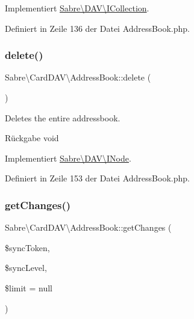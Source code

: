 Implementiert \mbox{\hyperlink{interface_sabre_1_1_d_a_v_1_1_i_collection_a837d88dac548706770368200f83c2ebc}{Sabre\textbackslash{}\+D\+A\+V\textbackslash{}\+I\+Collection}}.



Definiert in Zeile 136 der Datei Address\+Book.\+php.

\mbox{\label{class_sabre_1_1_card_d_a_v_1_1_address_book_a1bbb96f2d63e34d67c6172c0b3062376}} 
\subsubsection{\texorpdfstring{delete()}{delete()}}
{\footnotesize\ttfamily Sabre\textbackslash{}\+Card\+D\+A\+V\textbackslash{}\+Address\+Book\+::delete (\begin{DoxyParamCaption}{ }\end{DoxyParamCaption})}

Deletes the entire addressbook.

\begin{DoxyReturn}{Rückgabe}
void 
\end{DoxyReturn}


Implementiert \mbox{\hyperlink{interface_sabre_1_1_d_a_v_1_1_i_node_a72cd0ee4e36dfced2b0412d14dbd73e6}{Sabre\textbackslash{}\+D\+A\+V\textbackslash{}\+I\+Node}}.



Definiert in Zeile 153 der Datei Address\+Book.\+php.

\mbox{\label{class_sabre_1_1_card_d_a_v_1_1_address_book_aa288c8012839af18a3f99ca4639b2f3b}} 
\subsubsection{\texorpdfstring{get\+Changes()}{getChanges()}}
{\footnotesize\ttfamily Sabre\textbackslash{}\+Card\+D\+A\+V\textbackslash{}\+Address\+Book\+::get\+Changes (\begin{DoxyParamCaption}\item[{}]{\$sync\+Token,  }\item[{}]{\$sync\+Level,  }\item[{}]{\$limit = {\ttfamily null} }\end{DoxyParamCaption})}

